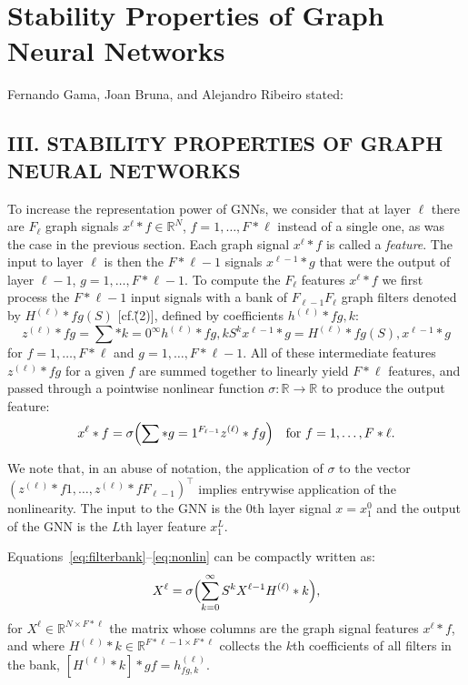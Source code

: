 \documentclass[11pt]{article}\usepackage{amsmath,amssymb,amsthm,bbm}
\newcommand{\1}{\mathbbm{1}}
\begin{document}
\section*{Stability Properties of Graph Neural Networks}
Fernando Gama, Joan Bruna, and Alejandro Ribeiro stated:

\subsection*{III. STABILITY PROPERTIES OF GRAPH NEURAL NETWORKS}
 To increase the representation power of GNNs, we consider that at layer $\ell$ there are $F_{\ell}$ graph signals $x^{\ell}*f \in \mathbb{R}^N$, $f=1,\dots,F*{\ell}$ instead of a single one, as was the case in the previous section. Each graph signal $x^{\ell}*f$ is called a \emph{feature}. The input to layer $\ell$ is then the $F*{\ell-1}$ signals $x^{\ell-1}*g$ that were the output of layer $\ell-1$, $g=1,\dots,F*{\ell-1}$. To compute the $F_{\ell}$ features $x^{\ell}*f$ we first process the $F*{\ell-1}$ input signals with a bank of $F_{\ell-1}F_{\ell}$ graph filters denoted by $H^{(\ell)}*{fg}(S)$ [cf.\~(2)], defined by coefficients $h^{(\ell)}*{fg,k}$:
\begin{equation}\label{eq:filterbank}
z^{(\ell)}*{fg} = \sum*{k=0}^{\infty} h^{(\ell)}*{fg,k} S^k x^{\ell-1}*g = H^{(\ell)}*{fg}(S),x^{\ell-1}*g \end{equation}
for $f=1,\dots,F*{\ell}$ and $g=1,\dots,F*{\ell-1}$. All of these intermediate features $z^{(\ell)}*{fg}$ for a given $f$ are summed together to linearly yield $F*{\ell}$ features, and passed through a pointwise nonlinear function $\sigma: \mathbb{R}\to\mathbb{R}$ to produce the output feature:
\begin{equation}\label{eq:nonlin}
x^{\ell}*f = \sigma\Bigl(\sum*{g=1}^{F_{\ell-1}} z^{(\ell)}*{fg}\Bigr)\quad\text{for }f=1,\dots,F*{\ell}.
\end{equation}

We note that, in an abuse of notation, the application of $\sigma$ to the vector $(z^{(\ell)}*{f1},\dots,z^{(\ell)}*{fF_{\ell-1}})^\top$ implies entrywise application of the nonlinearity. The input to the GNN is the 0th layer signal $x = x^0_1$ and the output of the GNN is the $L$th layer feature $x^L_1$.

Equations~\eqref{eq:filterbank}--\eqref{eq:nonlin} can be compactly written as:
\begin{equation}\label{eq:matrixform}
X^{\ell} = \sigma\Bigl(\sum_{k=0}^{\infty} S^k X^{\ell-1} H^{(\ell)}*k\Bigr),
\end{equation}
for $X^{\ell}\in\mathbb{R}^{N\times F*{\ell}}$ the matrix whose columns are the graph signal features $x^{\ell}*f$, and where $H^{(\ell)}*k\in\mathbb{R}^{F*{\ell-1}\times F*{\ell}}$ collects the $k$th coefficients of all filters in the bank, $[H^{(\ell)}*k]*{gf} = h^{(\ell)}_{fg,k}$.
\end{document}
